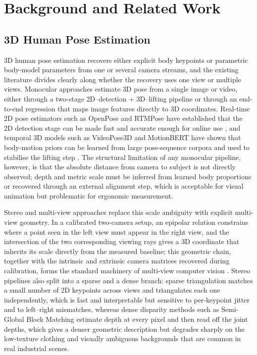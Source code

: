 \documentclass[12pt,a4paper]{article}
\begin{document}
\clearpage
\section{Background and Related Work}
\label{sec:background}

\subsection{3D Human Pose Estimation}

3D human pose estimation recovers either explicit body keypoints or
parametric body-model parameters from one or several camera streams, and the
existing literature divides clearly along whether the recovery uses one view
or multiple views.
Monocular approaches estimate 3D pose from a single image or video, either
through a two-stage 2D--detection + 3D--lifting pipeline or through an
end-to-end regression that maps image features directly to 3D coordinates.
Real-time 2D pose estimators such as OpenPose and RTMPose have established
that the 2D detection stage can be made fast and accurate enough for online
use \cite{cao2019openpose,jiang2023rtmpose}, and temporal 3D models such as
VideoPose3D and MotionBERT have shown that body-motion priors can be learned
from large pose-sequence corpora and used to stabilise the lifting step
\cite{pavllo20193d,zhu2023motionbert}.
The structural limitation of any monocular pipeline, however, is that the
absolute distance from camera to subject is not directly observed; depth and
metric scale must be inferred from learned body proportions or recovered
through an external alignment step, which is acceptable for visual
animation but problematic for ergonomic measurement.

Stereo and multi-view approaches replace this scale ambiguity with explicit
multi-view geometry.
In a calibrated two-camera setup, an epipolar relation constrains where a
point seen in the left view must appear in the right view, and the intersection
of the two corresponding viewing rays gives a 3D coordinate that inherits its
scale directly from the measured baseline; this geometric chain, together with
the intrinsic and extrinsic camera matrices recovered during calibration,
forms the standard machinery of multi-view computer vision
\cite{hartley2004multiple}.
Stereo pipelines also split into a sparse and a dense branch: sparse
triangulation matches a small number of 2D keypoints across views and
triangulates each one independently, which is fast and interpretable but
sensitive to per-keypoint jitter and to left--right mismatches, whereas
dense disparity methods such as Semi-Global Block Matching estimate depth at
every pixel \cite{hirschmuller2007sgbm} and then read off the joint depths,
which gives a denser geometric description but degrades sharply on the
low-texture clothing and visually ambiguous backgrounds that are common in
real industrial scenes.
\end{document}
